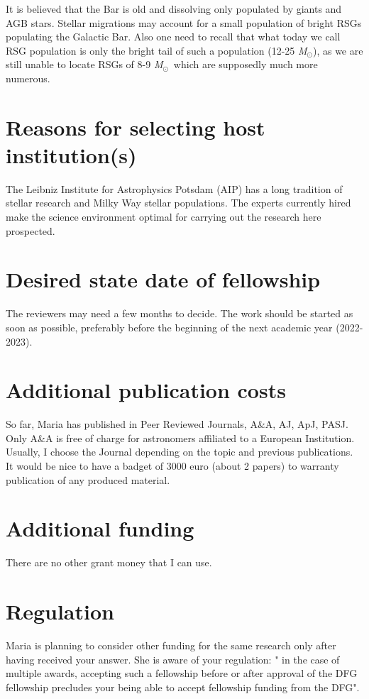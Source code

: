 \documentclass[final,11pt,onecolumn,a4paper,twoside]{scrbook_gj}
\newcommand{\Msun}{$\mathcal{M}_\odot$}
\def\Msun{\hbox{\it M$_\odot$}}
\def\Msun{\hbox{\it M$_\odot$}}
\begin{document}
It is believed that the Bar is old and dissolving 
only populated by giants and AGB stars.
Stellar migrations may account for a small 
population of bright RSGs populating the Galactic Bar.
Also one need to recall that what today 
we call RSG population is only the bright 
tail of such a population (12-25 \Msun), as we are 
still unable to locate RSGs of 8-9 \Msun\
which are supposedly much more numerous.


\section{ Reasons for selecting host institution(s)}
The Leibniz Institute for Astrophysics Potsdam (AIP)
has a long tradition of stellar research and
Milky Way stellar populations. The experts
currently hired  make the science environment
optimal for carrying out the research here prospected.

\section{ Desired state date of fellowship}
The reviewers may need a few months to decide.
The work should be started as soon as possible,
preferably before the beginning of the 
next academic year (2022-2023).

\section{ Additional publication costs}
So far, Maria has published in  Peer Reviewed Journals,
A\&A, AJ, ApJ, PASJ.
Only A\&A is free of charge
for astronomers affiliated to a European Institution.
Usually, I choose the Journal depending on the topic
and previous publications. 
It would be nice to have a badget
of 3000 euro (about 2 papers) to warranty
publication of any produced material. 

\section{ Additional funding}
There are no other grant money that I can use.

\section{ Regulation} 
Maria is  planning to consider other funding
for the same research only after having received your answer.
She  is aware of your regulation:
" in the case of multiple awards, accepting such a fellowship 
before or after approval of the DFG fellowship precludes your 
being able to accept fellowship funding from the DFG".
\end{document}
